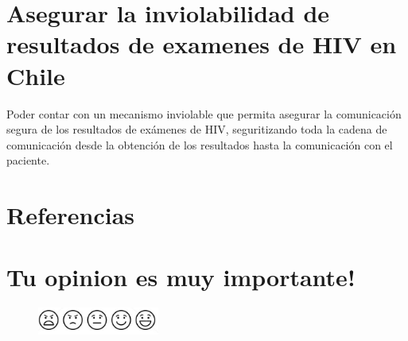 \documentclass[12pt,letterpaper]{article}
\begin{document}
\section{Asegurar la inviolabilidad de resultados de examenes de HIV en Chile }

Poder contar con un mecanismo inviolable que permita asegurar la comunicación  segura de los resultados de exámenes de HIV, seguritizando toda la cadena de comunicación desde la obtención de los resultados hasta la comunicación con el paciente.

\section{Referencias\label{sec:references}}

\printbibliography[heading=none]

\section{Tu opinion es muy importante!}
\begin{figure}
    \centering
    \includegraphics[width=4cm]{./images/vote.png}
    \captionsetup{justification=centering, singlelinecheck=false}
\end{figure}
\end{document}
